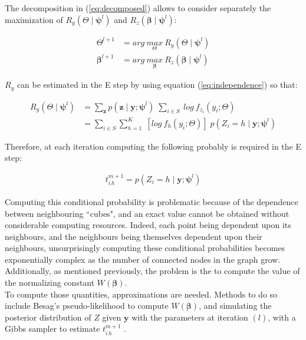 The decomposition in (\ref{eq:decomposed}) allows to consider separately the maximization of $R_y(\Theta\mid \boldsymbol{\psi}^l)$ and $R_z(\boldsymbol{\beta}\mid \boldsymbol{\psi}^l)$:


\begin{align*}
\Theta^{l+1} &= arg\:\underset{\Theta}{max}\:R_y(\Theta\mid \boldsymbol{\psi}^l)\\
\boldsymbol{\beta}^{l+1} &= arg\:\underset{\boldsymbol{\beta}}{max}\:R_z(\boldsymbol{\beta}\mid \boldsymbol{\psi}^l)
\end{align*}

$R_y$ can be estimated in the E step by using equation (\ref{eq:independence}) so that:

\begin{align*}
R_y(\Theta\mid \boldsymbol{\psi}^l) &= \sum\limits_{\boldsymbol{z}} p(\boldsymbol{z}\mid \boldsymbol{y} ; \boldsymbol{\psi}^{l})\;\sum\limits_{i \in S}\: log\: f_{z_i} (y_i ; \Theta)\\
&= \sum\limits_{i \in S} \sum\limits_{h=1}^{K}\; \left[log\: f_{h} (y_i  ; \Theta) \right] \; p(Z_i = h \mid \boldsymbol{y};\boldsymbol{\psi}^{l})
\end{align*}  

Therefore, at each iteration computing the following probably is required in the E step:

\begin{align*}
t_{i\,h}^{m+1} = p(Z_i = h \mid \boldsymbol{y};\boldsymbol{\psi}^{l})
\end{align*}

Computing this conditional probability is problematic because of the dependence between neighbouring ``cubes", and an exact value cannot be obtained without considerable computing resources. Indeed, each point being dependent upon its neighbours, and the neighbours being themselves dependent upon their neighbours, unsurprisingly computing these conditional probabilities becomes exponentially complex as the number of connected nodes in the graph grow. Additionally, as mentioned previously, the problem is the to compute the value of the normalizing constant $W(\boldsymbol{\beta})$.\\

To compute those quantities, approximations are needed. Methods to do so include Besag's pseudo-likelihood \cite{Besag75} to compute $W(\boldsymbol{\beta})$, and simulating the posterior distribution of $Z$ given $\boldsymbol{y}$ with the parameters at iteration $(l)$, with a Gibbs sampler to estimate $t_{i\,h}^{m+1}$ \cite{Chalmond89}.\\

